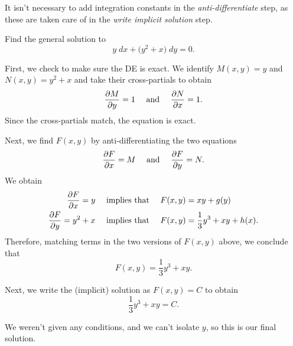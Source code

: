 \documentclass{book}
\begin{document}
\begin{heads}
  It isn't necessary to add integration constants in the
  \emph{anti-differentiate} step, as these are taken care of in the
  \emph{write implicit solution} step.
\end{heads}

\newpage
\begin{example}
  Find the general solution to
  \begin{equation*}
    y \;dx + \bigl( y^2 + x \bigr) \;dy = 0.
  \end{equation*}
\end{example}

\begin{solution}

  First, we check to make sure the DE is exact.  We identify $M(x,y) =
  y$ and $N(x,y) = y^2 + x$ and take their cross-partials to obtain
  \begin{equation*}
    \frac{\partial M}{\partial y} = 1 \quad \text{ and } \quad \frac{\partial N}{\partial x} = 1.
  \end{equation*}
  Since the cross-partials match, the equation is exact.


  Next, we find $F(x,y)$ by anti-differentiating the two equations
  \begin{equation*}
    \frac{\partial F}{\partial x} = M \quad \text{ and } \quad \frac{\partial F}{\partial y} = N.
  \end{equation*}
  We obtain
  \begin{align*}
    \frac{\partial F}{\partial x} = y \quad \text{ implies that } \quad F(x,y) &= xy + g(y) \\
    \frac{\partial F}{\partial y} = y^2 + x \quad \text{ implies that } \quad F(x,y) &= \frac{1}{3} y^3 + xy + h(x).
  \end{align*}
  Therefore, matching terms in the two versions of $F(x,y)$ above, we
  conclude that
  \begin{equation*}
    F(x,y) = \frac{1}{3} y^3 + xy.
  \end{equation*}


  Next, we write the (implicit) solution as $F(x,y) = C$ to obtain
  \begin{equation*}
    \frac{1}{3} y^3 + xy = C.
  \end{equation*}

  We weren't given any conditions, and we can't isolate $y$, so this
  is our final solution.
\end{solution}
\end{document}
